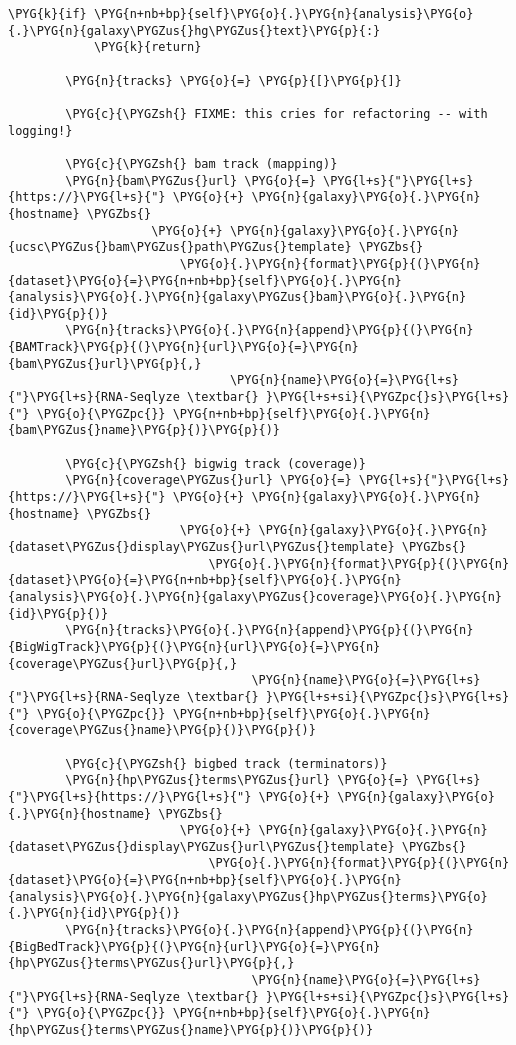 \begin{Verbatim}[commandchars=\\\{\}]
        \PYG{k}{if} \PYG{n+nb+bp}{self}\PYG{o}{.}\PYG{n}{analysis}\PYG{o}{.}\PYG{n}{galaxy\PYGZus{}hg\PYGZus{}text}\PYG{p}{:}
            \PYG{k}{return}

        \PYG{n}{tracks} \PYG{o}{=} \PYG{p}{[}\PYG{p}{]}

        \PYG{c}{\PYGZsh{} FIXME: this cries for refactoring -- with logging!}

        \PYG{c}{\PYGZsh{} bam track (mapping)}
        \PYG{n}{bam\PYGZus{}url} \PYG{o}{=} \PYG{l+s}{"}\PYG{l+s}{https://}\PYG{l+s}{"} \PYG{o}{+} \PYG{n}{galaxy}\PYG{o}{.}\PYG{n}{hostname} \PYGZbs{}
                    \PYG{o}{+} \PYG{n}{galaxy}\PYG{o}{.}\PYG{n}{ucsc\PYGZus{}bam\PYGZus{}path\PYGZus{}template} \PYGZbs{}
                        \PYG{o}{.}\PYG{n}{format}\PYG{p}{(}\PYG{n}{dataset}\PYG{o}{=}\PYG{n+nb+bp}{self}\PYG{o}{.}\PYG{n}{analysis}\PYG{o}{.}\PYG{n}{galaxy\PYGZus{}bam}\PYG{o}{.}\PYG{n}{id}\PYG{p}{)}
        \PYG{n}{tracks}\PYG{o}{.}\PYG{n}{append}\PYG{p}{(}\PYG{n}{BAMTrack}\PYG{p}{(}\PYG{n}{url}\PYG{o}{=}\PYG{n}{bam\PYGZus{}url}\PYG{p}{,}
                               \PYG{n}{name}\PYG{o}{=}\PYG{l+s}{"}\PYG{l+s}{RNA-Seqlyze \textbar{} }\PYG{l+s+si}{\PYGZpc{}s}\PYG{l+s}{"} \PYG{o}{\PYGZpc{}} \PYG{n+nb+bp}{self}\PYG{o}{.}\PYG{n}{bam\PYGZus{}name}\PYG{p}{)}\PYG{p}{)}

        \PYG{c}{\PYGZsh{} bigwig track (coverage)}
        \PYG{n}{coverage\PYGZus{}url} \PYG{o}{=} \PYG{l+s}{"}\PYG{l+s}{https://}\PYG{l+s}{"} \PYG{o}{+} \PYG{n}{galaxy}\PYG{o}{.}\PYG{n}{hostname} \PYGZbs{}
                        \PYG{o}{+} \PYG{n}{galaxy}\PYG{o}{.}\PYG{n}{dataset\PYGZus{}display\PYGZus{}url\PYGZus{}template} \PYGZbs{}
                            \PYG{o}{.}\PYG{n}{format}\PYG{p}{(}\PYG{n}{dataset}\PYG{o}{=}\PYG{n+nb+bp}{self}\PYG{o}{.}\PYG{n}{analysis}\PYG{o}{.}\PYG{n}{galaxy\PYGZus{}coverage}\PYG{o}{.}\PYG{n}{id}\PYG{p}{)}
        \PYG{n}{tracks}\PYG{o}{.}\PYG{n}{append}\PYG{p}{(}\PYG{n}{BigWigTrack}\PYG{p}{(}\PYG{n}{url}\PYG{o}{=}\PYG{n}{coverage\PYGZus{}url}\PYG{p}{,}
                                  \PYG{n}{name}\PYG{o}{=}\PYG{l+s}{"}\PYG{l+s}{RNA-Seqlyze \textbar{} }\PYG{l+s+si}{\PYGZpc{}s}\PYG{l+s}{"} \PYG{o}{\PYGZpc{}} \PYG{n+nb+bp}{self}\PYG{o}{.}\PYG{n}{coverage\PYGZus{}name}\PYG{p}{)}\PYG{p}{)}

        \PYG{c}{\PYGZsh{} bigbed track (terminators)}
        \PYG{n}{hp\PYGZus{}terms\PYGZus{}url} \PYG{o}{=} \PYG{l+s}{"}\PYG{l+s}{https://}\PYG{l+s}{"} \PYG{o}{+} \PYG{n}{galaxy}\PYG{o}{.}\PYG{n}{hostname} \PYGZbs{}
                        \PYG{o}{+} \PYG{n}{galaxy}\PYG{o}{.}\PYG{n}{dataset\PYGZus{}display\PYGZus{}url\PYGZus{}template} \PYGZbs{}
                            \PYG{o}{.}\PYG{n}{format}\PYG{p}{(}\PYG{n}{dataset}\PYG{o}{=}\PYG{n+nb+bp}{self}\PYG{o}{.}\PYG{n}{analysis}\PYG{o}{.}\PYG{n}{galaxy\PYGZus{}hp\PYGZus{}terms}\PYG{o}{.}\PYG{n}{id}\PYG{p}{)}
        \PYG{n}{tracks}\PYG{o}{.}\PYG{n}{append}\PYG{p}{(}\PYG{n}{BigBedTrack}\PYG{p}{(}\PYG{n}{url}\PYG{o}{=}\PYG{n}{hp\PYGZus{}terms\PYGZus{}url}\PYG{p}{,}
                                  \PYG{n}{name}\PYG{o}{=}\PYG{l+s}{"}\PYG{l+s}{RNA-Seqlyze \textbar{} }\PYG{l+s+si}{\PYGZpc{}s}\PYG{l+s}{"} \PYG{o}{\PYGZpc{}} \PYG{n+nb+bp}{self}\PYG{o}{.}\PYG{n}{hp\PYGZus{}terms\PYGZus{}name}\PYG{p}{)}\PYG{p}{)}


\end{Verbatim}
